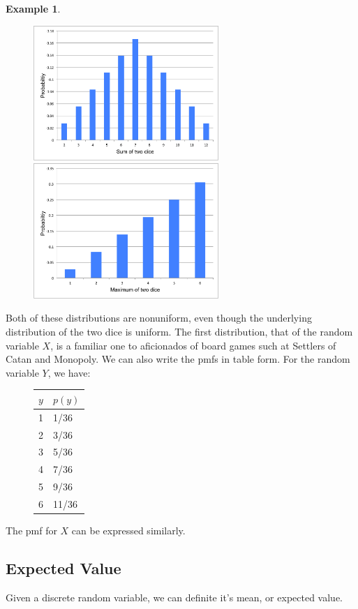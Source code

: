 \documentclass[12pt]{article}
\theoremstyle{definition}
\newtheorem*{example}{Example}
\theoremstyle{remark}
\begin{document}
\begin{example}
\begin{figure}[H]
\centering
\includegraphics[width=7cm]{sumoftwodice.pdf}
\includegraphics[width=7cm]{maxoftwodice.pdf}
\end{figure}
Both of these distributions are nonuniform, even though the underlying distribution of the two dice is uniform. The first distribution, that of the random variable $X$, is a familiar one to aficionados of board games such at Settlers of Catan and Monopoly. We can also write the pmfs in table form. For the random variable $Y$, we have:
\begin{figure}[H]
\centering
\begin{tabular}{l@{\hskip 2cm}l}
\toprule
$y$ & $p(y)$\\
\midrule
1 & 1/36\\
2 & 3/36\\
3 & 5/36\\
4 & 7/36\\
5 & 9/36\\
6 & 11/36\\
\bottomrule
\end{tabular}
\end{figure}
The pmf for $X$ can be expressed similarly.
\end{example}

\subsection{Expected Value}
Given a discrete random variable, we can definite it's mean, or expected value. 
\end{document}
